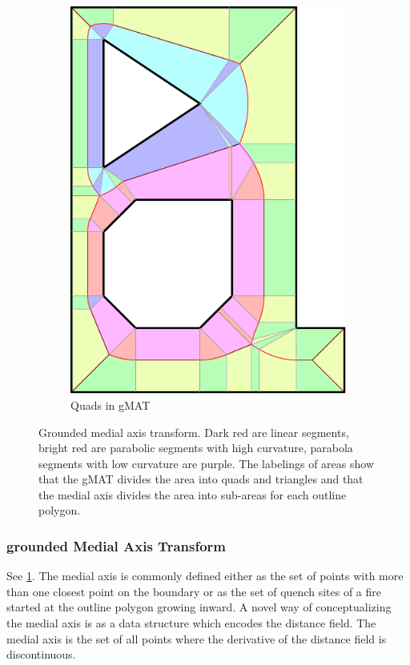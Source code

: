 \begin{figure}
\begin{subfigure}{0.3\columnwidth}
\includegraphics[width=\columnwidth]{sources/method/gMAT_example_labeling.pdf}
\caption{Quads in gMAT}
\end{subfigure}
\caption{Grounded medial axis transform. Dark red are linear segments,  bright red are parabolic segments with high curvature, parabola segments with low curvature are purple. The labelings of areas show that the gMAT divides the area into quads and triangles and that the medial axis divides the area into sub-areas for each outline polygon.}
\label{gmat}
\end{figure}



\subsubsection{grounded Medial Axis Transform}
See \cref{gmat}.
The medial axis is commonly defined either as the set of points with more than one closest point on the boundary or as the set of quench sites of a fire started at the outline polygon growing inward.
A novel way of conceptualizing the medial axis is as a data structure which encodes the distance field.
The medial axis is the set of all points where the derivative of the distance field is discontinuous.

